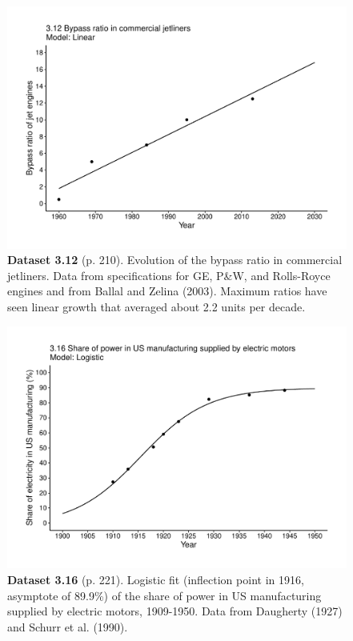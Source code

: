 \documentclass[aps,rmp,preprint,superscriptaddress,10pt,onecolumn]{article}
\begin{document}
\clearpage
\begin{figure}[h]
\includegraphics[width=\textwidth]{output/figs-ggplot/3.12.pdf}
\caption*{\textbf{Dataset 3.12} (p. 210). Evolution of the bypass ratio in commercial jetliners. Data from specifications for GE, P\&W, and Rolls-Royce engines and from Ballal and Zelina (2003). Maximum ratios have seen linear growth that averaged about 2.2 units per decade.}
\end{figure}
	
\clearpage
\begin{figure}[h]
\includegraphics[width=\textwidth]{output/figs-ggplot/3.16.pdf}
\caption*{\textbf{Dataset 3.16} (p. 221). Logistic fit (inflection point in 1916, asymptote of 89.9\%) of the share of power in US manufacturing supplied by electric motors, 1909-1950. Data from Daugherty (1927) and Schurr et al. (1990).}
\end{figure}
	
\end{document}
